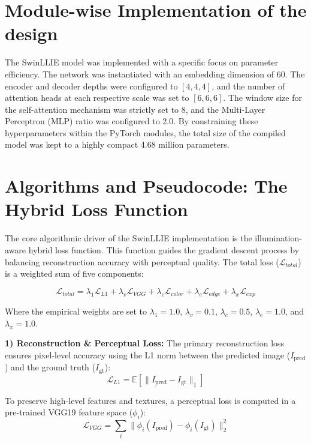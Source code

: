 \documentclass[12pt, a4paper]{report}
\begin{document}
\section{Module-wise Implementation of the design}
The SwinLLIE model was implemented with a specific focus on parameter efficiency. The network was instantiated with an embedding dimension of 60. The encoder and decoder depths were configured to $[4, 4, 4]$, and the number of attention heads at each respective scale was set to $[6, 6, 6]$. The window size for the self-attention mechanism was strictly set to 8, and the Multi-Layer Perceptron (MLP) ratio was configured to 2.0. By constraining these hyperparameters within the PyTorch modules, the total size of the compiled model was kept to a highly compact 4.68 million parameters.

\section{Algorithms and Pseudocode: The Hybrid Loss Function}
The core algorithmic driver of the SwinLLIE implementation is the illumination-aware hybrid loss function. This function guides the gradient descent process by balancing reconstruction accuracy with perceptual quality. The total loss ($\mathcal{L}_{total}$) is a weighted sum of five components:

\begin{equation}
\mathcal{L}_{total} = \lambda_1 \mathcal{L}_{L1} + \lambda_v \mathcal{L}_{VGG} + \lambda_c \mathcal{L}_{color} + \lambda_e \mathcal{L}_{edge} + \lambda_x \mathcal{L}_{exp}
\end{equation}

Where the empirical weights are set to $\lambda_1 = 1.0$, $\lambda_v = 0.1$, $\lambda_c = 0.5$, $\lambda_e = 1.0$, and $\lambda_x = 1.0$.

\textbf{1) Reconstruction \& Perceptual Loss:} The primary reconstruction loss ensures pixel-level accuracy using the L1 norm between the predicted image ($I_{\text{pred}}$) and the ground truth ($I_{\text{gt}}$):
\begin{equation}
\mathcal{L}_{L1} = \mathbb{E}[\|I_{\text{pred}} - I_{\text{gt}}\|_1]
\end{equation}

To preserve high-level features and textures, a perceptual loss is computed in a pre-trained VGG19 feature space ($\phi_i$):
\begin{equation}
\mathcal{L}_{VGG} = \sum_{i} \|\phi_i(I_{\text{pred}}) - \phi_i(I_{\text{gt}})\|_2^2
\end{equation}
\end{document}
